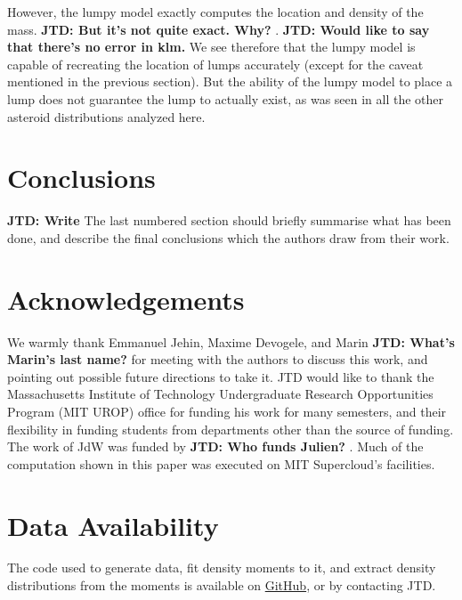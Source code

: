 \documentclass[fleqn,usenatbib]{mnras}
\newcommand{\jtd}[1]{ {\bf{\color{red} JTD: #1}} }
\begin{document}
However, the lumpy model exactly computes the location and density of the mass. \jtd{But it's not quite exact. Why?}. \jtd{Would like to say that there's no error in klm.} We see therefore that the lumpy model is capable of recreating the location of lumps accurately (except for the caveat mentioned in the previous section). But the ability of the lumpy model to place a lump does not guarantee the lump to actually exist, as was seen in all the other asteroid distributions analyzed here.

\section{Conclusions}

\jtd{Write}
The last numbered section should briefly summarise what has been done, and describe
the final conclusions which the authors draw from their work.

\section*{Acknowledgements}

We warmly thank Emmanuel Jehin, Maxime Devogele, and Marin \jtd{What's Marin's last name?} for meeting with the authors to discuss this work, and pointing out possible future directions to take it. JTD would like to thank the Massachusetts Institute of Technology Undergraduate Research Opportunities Program (MIT UROP) office for funding his work for many semesters, and their flexibility in funding students from departments other than the source of funding. The work of JdW was funded by \jtd{Who funds Julien?}. Much of the computation shown in this paper was executed on MIT Supercloud's facilities.



\section*{Data Availability}

The code used to generate data, fit density moments to it, and extract density distributions from the moments is available on \href{https://github.com/jack-dinsmore/asteroid-tidal-torque}{GitHub}, or by contacting JTD.






\end{document}

